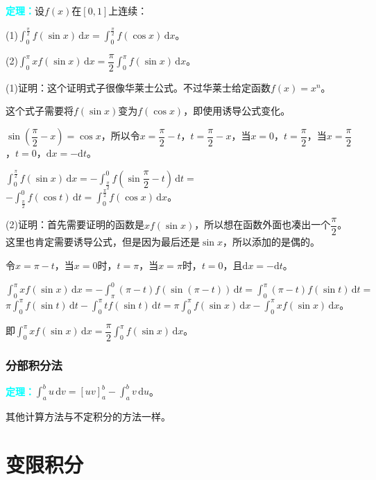 \documentclass[UTF8, 12pt]{ctexart}
\begin{document}
        \textcolor{aqua}{\textbf{定理：}}设$f(x)$在$[0,1]$上连续：

        (1)$\int_0^\frac{\pi}{2}f(\sin x)\,\textrm{d}x=\int_0^\frac{\pi}{2}f(\cos x)\,\textrm{d}x$。

        (2)$\int_0^\pi xf(\sin x)\,\textrm{d}x=\dfrac{\pi}{2}\int_0^\pi f(\sin x)\,\textrm{d}x$。

        (1)证明：这个证明式子很像华莱士公式。不过华莱士给定函数$f(x)=x^n$。

        这个式子需要将$f(\sin x)$变为$f(\cos x)$，即使用诱导公式变化。

        $\sin\left(\dfrac{\pi}{2}-x\right)=\cos x$，所以令$x=\dfrac{\pi}{2}-t$，$t=\dfrac{\pi}{2}-x$，当$x=0$，$t=\dfrac{\pi}{2}$，当$x=\dfrac{\pi}{2}$，$t=0$，$\textrm{d}x=-\textrm{d}t$。

        $\int_0^\frac{\pi}{2}f(\sin x)\,\textrm{d}x=-\displaystyle{\int_\frac{\pi}{2}^0f\left(\sin\dfrac{\pi}{2}-t\right)\,\textrm{d}t}=$$-\int_\frac{\pi}{2}^0f(\cos t)\,\textrm{d}t=\int^\frac{\pi}{2}_0f(\cos x)\,\textrm{d}x$。

        (2)证明：首先需要证明的函数是$xf(\sin x)$，所以想在函数外面也凑出一个$\dfrac{\pi}{2}$。这里也肯定需要诱导公式，但是因为最后还是$\sin x$，所以添加的是偶的。

        令$x=\pi-t$，当$x=0$时，$t=\pi$，当$x=\pi$时，$t=0$，且$\textrm{d}x=-\textrm{d}t$。

        $\int_0^\pi xf(\sin x)\,\textrm{d}x=-\int_\pi^0(\pi-t)f(\sin(\pi-t))\,\textrm{d}t=\int_0^\pi(\pi-t)f(\sin t)\,\textrm{d}t=$\\$\pi\int_0^\pi f(\sin t)\,\textrm{d}t-\int_0^\pi tf(\sin t)\,\textrm{d}t=\pi\int_0^\pi f(\sin x)\,\textrm{d}x-\int_0^\pi xf(\sin x)\,\textrm{d}x$。

        即$\int_0^\pi xf(\sin x)\,\textrm{d}x=\dfrac{\pi}{2}\int_0^\pi f(\sin x)\,\textrm{d}x$。

        \subsubsection{分部积分法}

        \textcolor{aqua}{\textbf{定理：}}$\int_a^bu\,\textrm{d}v=[uv]_a^b-\int_a^bv\,\textrm{d}u$。

        其他计算方法与不定积分的方法一样。

        \section{变限积分}
\end{document}
